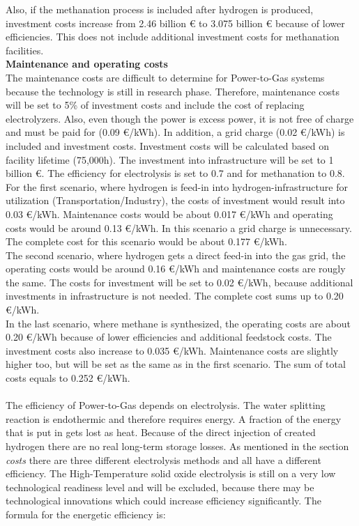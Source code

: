 \begin{parcolumns}[colwidths={1=2.5 cm, 2=10 cm, 3=2.5 cm}]{3}
{Also, if the methanation process is included after hydrogen is produced, investment costs increase from 2.46 billion \euro{ } to 3.075 billion \euro{ } because of lower efficiencies. This does not include additional investment costs for methanation facilities.
\\
\textbf{Maintenance and operating costs}
\\
The maintenance costs are difficult to determine for Power-to-Gas systems because the technology is still in research phase. Therefore, maintenance costs will be set to 5\% of investment costs and include the cost of replacing electrolyzers. Also, even though the power is excess power, it is not free of charge and must be paid for (0.09 \euro /kWh). In addition, a grid charge (0.02 \euro /kWh) is included and investment costs. Investment costs will be calculated based on facility lifetime (75,000h). The investment into infrastructure will be set to 1 billion \euro . The efficiency for electrolysis is set to 0.7 and for methanation to 0.8.
\\
For the first scenario, where hydrogen is feed-in into hydrogen-infrastructure for utilization (Transportation/Industry), the costs of investment would result into 0.03 \euro /kWh. Maintenance costs would be about 0.017 \euro /kWh and operating costs would be around 0.13 \euro /kWh. In this scenario a grid charge is unnecessary. The complete cost for this scenario would be about 0.177 \euro /kWh.
\\
The second scenario, where hydrogen gets a direct feed-in into the gas grid, the operating costs would be around 0.16 \euro /kWh and maintenance costs are rougly the same. The costs for investment will be set to 0.02 \euro /kWh, because additional investments in infrastructure is not needed. The complete cost sums up to 0.20 \euro /kWh.
\\
In the last scenario, where methane is synthesized, the operating costs are about 0.20 \euro /kWh because of lower efficiencies and additional feedstock costs. The investment costs also increase to 0.035 \euro /kWh. Maintenance costs are slightly higher too, but will be set as the same as in the first scenario. The sum of total costs equals to 0.252 \euro /kWh.\\
 \\
The efficiency of Power-to-Gas depends on electrolysis. The water splitting reaction is endothermic and therefore requires energy. A fraction of the energy that is put in gets lost as heat. Because of the direct injection of created hydrogen there are no real long-term storage losses. As mentioned in the section \textit{costs} there are three different electrolysis methods and all have a different efficiency. The High-Temperature solid oxide electrolysis is still on a very low technological readiness level and will be excluded, because there may be technological innovations which could increase efficiency significantly. The formula for the energetic efficiency is: \\
}
\end{parcolumns}
